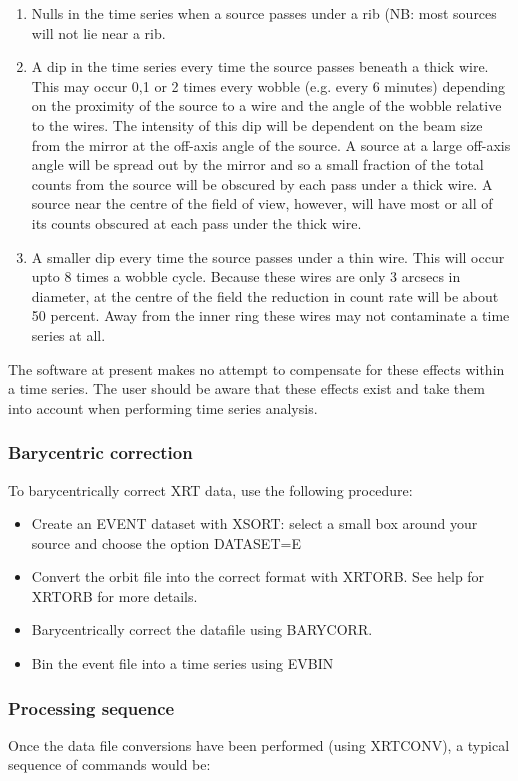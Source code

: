 \documentclass{book}
\renewcommand{\_}{{\tt\char'137}}     %
\begin{document}
\begin{enumerate}
\item Nulls in the time series when a source passes under a rib (NB:
most sources will not lie near a rib.
\item A dip in the time series every time the source passes beneath a
thick wire. This may occur 0,1 or 2 times every wobble (e.g. every
6 minutes) depending on the proximity of the source to a wire and
the angle of the wobble relative to the wires. The intensity of this
dip will be dependent on the beam size from the mirror at the
off-axis angle of the source. A source at a large off-axis angle
will be spread out by the mirror and so a small fraction of the
total counts from the source will be obscured by each pass under
a thick wire. A source near the centre of the field of view,
however, will have most or all of its counts obscured at each pass
under the thick wire.
\item A smaller dip every time the source passes under a thin wire.
This will occur upto 8 times a wobble cycle. Because these wires
are only 3 arcsecs in diameter, at the centre of the field
the reduction in count rate will be about 50 percent. Away from the
inner ring these wires may not contaminate a time series at all.
\end{enumerate}
The software at present makes no attempt to compensate for these effects
within a time series. The user should be aware that these effects exist
and take them into account when performing time series analysis.
 
\subsubsection{Barycentric correction}
To barycentrically correct XRT data, use the following procedure:
\begin{itemize}
\item Create an EVENT dataset with XSORT: select a small box around
your source and choose the option DATASET=E
\item Convert the orbit file into the correct format with XRTORB. See
help for XRTORB for more details.
\item Barycentrically correct the datafile using BARYCORR.
\item Bin the event file into a time series using EVBIN
\end{itemize}
\subsubsection{Processing sequence}
Once the data file conversions have been performed (using XRTCONV), a
typical sequence of commands would be:
 
\end{document}
